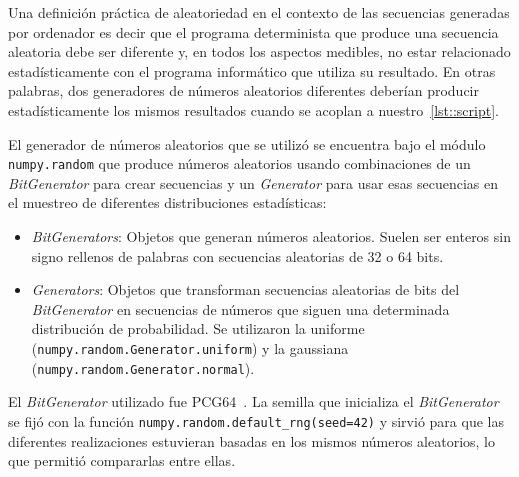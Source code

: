 Una definición práctica de aleatoriedad en el contexto de las secuencias generadas por ordenador es decir que el programa determinista que produce una secuencia aleatoria debe ser diferente y, en todos los aspectos medibles, no estar relacionado estadísticamente con el programa informático que utiliza su resultado. En otras palabras, dos generadores de números aleatorios diferentes deberían producir estadísticamente los mismos resultados cuando se acoplan a nuestro~\autoref{lst::script}.

El generador de números aleatorios que se utilizó se encuentra bajo el módulo \texttt{numpy.random} que produce números aleatorios usando combinaciones de un \textit{BitGenerator} para crear secuencias y un \textit{Generator} para usar esas secuencias en el muestreo de diferentes distribuciones estadísticas:
\begin{itemize}
    \item \textit{BitGenerators}: Objetos que generan números aleatorios. Suelen ser enteros sin signo rellenos de palabras con secuencias aleatorias de 32 o 64 bits.
    \item \textit{Generators}: Objetos que transforman secuencias aleatorias de bits del \textit{BitGenerator} en secuencias de números que siguen una determinada distribución de probabilidad. Se utilizaron la uniforme (\texttt{numpy.random.Generator.uniform}) y la gaussiana (\texttt{numpy.random.Generator.normal}).
\end{itemize}

El \textit{BitGenerator} utilizado fue PCG64~\cite{o2014pcg}. La semilla que inicializa el \textit{BitGenerator} se fijó con la función \texttt{numpy.random.default\_rng(seed=42)} y sirvió para que las diferentes realizaciones estuvieran basadas en los mismos números aleatorios, lo que permitió compararlas entre ellas.
